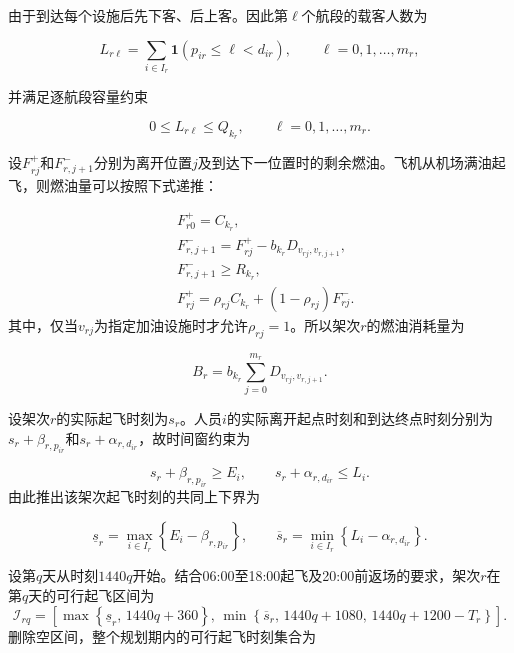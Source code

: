 \documentclass[UTF-8,a4paper,zihao=-4]{ctexart}
\begin{document}
由于到达每个设施后先下客、后上客。因此第$\ell$个航段的载客人数为

\begin{equation}
L_{r\ell}
=
\sum_{i\in I_r}
\mathbf{1}
\left(
p_{ir}\leq \ell<d_{ir}
\right),
\qquad
\ell=0,1,\ldots,m_r,
\end{equation}

并满足逐航段容量约束

\begin{equation}
0\leq L_{r\ell}\leq Q_{k_r},
\qquad
\ell=0,1,\ldots,m_r.
\end{equation}

设$F_{rj}^{+}$和$F_{r,j+1}^{-}$分别为离开位置$j$及到达下一位置时的剩余燃油。飞机从机场满油起飞，则燃油量可以按照下式递推：

\begin{equation}
\begin{aligned}
&F_{r0}^{+}=C_{k_r},\\
&F_{r,j+1}^{-}
=
F_{rj}^{+}
-
b_{k_r}D_{v_{rj},v_{r,j+1}},\\
&F_{r,j+1}^{-}\geq R_{k_r},\\
&F_{rj}^{+}
=
\rho_{rj}C_{k_r}
+
(1-\rho_{rj})F_{rj}^{-}.
\end{aligned}
\end{equation}
其中，仅当$v_{rj}$为指定加油设施时才允许$\rho_{rj}=1$。所以架次$r$的燃油消耗量为

\begin{equation}
B_r
=
b_{k_r}
\sum_{j=0}^{m_r}
D_{v_{rj},v_{r,j+1}}.
\end{equation}

设架次$r$的实际起飞时刻为$s_r$。人员$i$的实际离开起点时刻和到达终点时刻分别为$s_r+\beta_{r,p_{ir}}$和$s_r+\alpha_{r,d_{ir}}$，故时间窗约束为

\begin{equation}
s_r+\beta_{r,p_{ir}}\geq E_i,
\qquad
s_r+\alpha_{r,d_{ir}}\leq L_i.
\end{equation}
由此推出该架次起飞时刻的共同上下界为

\begin{equation}
\underline{s}_r
=
\max_{i\in I_r}
\left\{
E_i-\beta_{r,p_{ir}}
\right\},
\qquad
\overline{s}_r
=
\min_{i\in I_r}
\left\{
L_i-\alpha_{r,d_{ir}}
\right\}.
\end{equation}

设第$q$天从时刻$1440q$开始。结合06:00至18:00起飞及20:00前返场的要求，架次$r$在第$q$天的可行起飞区间为
\begin{equation}
\mathcal{I}_{rq}
=
\left[
\max
\left\{
\underline{s}_r,\,
1440q+360
\right\},
\,
\min
\left\{
\overline{s}_r,\,
1440q+1080,\,
1440q+1200-T_r
\right\}
\right].
\end{equation}
删除空区间，整个规划期内的可行起飞时刻集合为
\end{document}
